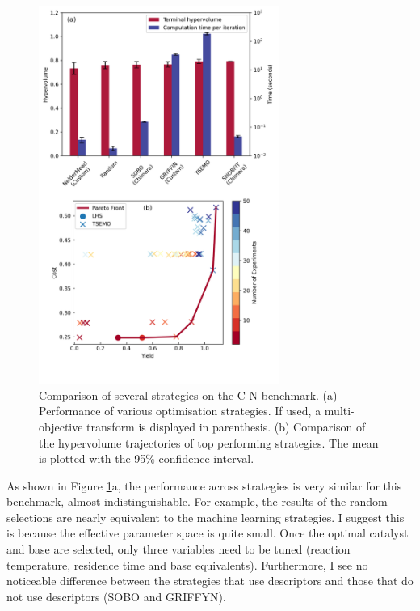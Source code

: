 \begin{figure}
    \centering
    \includegraphics[width=0.7\textwidth]{gfx/Chapter03/cn_hv_time_tradeoff.png}
    \caption{Comparison of several strategies on the C-N benchmark. (a) Performance of various optimisation strategies. If used, a multi-objective transform is displayed in parenthesis. (b) Comparison of the hypervolume trajectories of top performing strategies. The mean is plotted with the 95\% confidence interval.}
    \label{fig:cn_hv_time}
\end{figure}

As shown in Figure \ref{fig:cn_hv_time}a, the performance across strategies is very similar for this benchmark, almost indistinguishable. For example, the results of the random selections are nearly equivalent to the machine learning strategies. I suggest this is because the effective parameter space is quite small. Once the optimal catalyst and base are selected, only three variables need to be tuned (reaction temperature, residence time and base equivalents). Furthermore, I see no noticeable difference between the strategies that use descriptors and those that do not use descriptors (SOBO and GRIFFYN).

